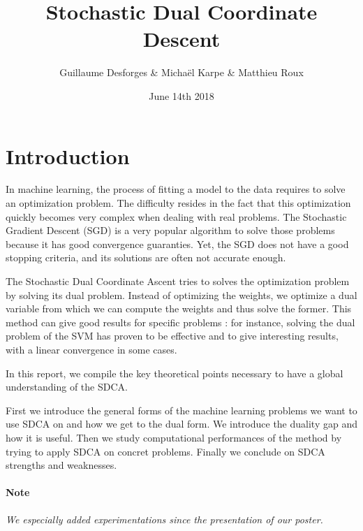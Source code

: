 \documentclass{article}
\title{Stochastic Dual Coordinate Descent}
\author{Guillaume Desforges \& Michaël Karpe \& Matthieu Roux}
\date{June 14th 2018}
\begin{document}
\maketitle

\section*{Introduction}

\hspace{2em}
In machine learning, the process of fitting a model to the data requires to solve an optimization problem.
The difficulty resides in the fact that this optimization quickly becomes very complex when dealing with real problems.
The Stochastic Gradient Descent (SGD) is a very popular algorithm to solve those problems because it has good convergence guaranties.
Yet, the SGD does not have a good stopping criteria, and its solutions are often not accurate enough.

\hspace{2em}
The Stochastic Dual Coordinate Ascent tries to solves the optimization problem by solving its dual problem.
Instead of optimizing the weights, we optimize a dual variable from which we can compute the weights and thus solve the former.
This method can give good results for specific problems : for instance, solving the dual problem of the SVM has proven to be effective and to give interesting results, with a linear convergence in some cases.

\hspace{2em}
In this report, we compile the key theoretical points necessary to have a global understanding of the SDCA.

\hspace{2em}
First we introduce the general forms of the machine learning problems we want to use SDCA on and how we get to the dual form.
We introduce the duality gap and how it is useful.
Then we study computational performances of the method by trying to apply SDCA on concret problems.
Finally we conclude on SDCA strengths and weaknesses.

\paragraph{Note} \textit{We especially added experimentations since the presentation of our poster.}
\end{document}
